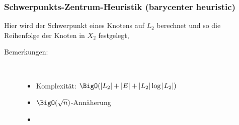 \topbreak
\vspace*{-2\baselineskip}
\subsubsection{Schwerpunkts-Zentrum-Heuristik (barycenter heuristic)}
Hier wird der Schwerpunkt eines Knotens auf $L_2$ berechnet und so die Reihenfolge der Knoten in $X_2$ festgelegt, 
\begin{description}
	\item[Bemerkungen:] \ \\ \vspace*{-\baselineskip}
		\begin{itemize}[itemsep=-1pt]
			\item Komplexität: $\BigO(|L_2|+|E|+|L_2|\log|L_2|)$
			\item $\BigO(\sqrt{n})$-Annäherung
			\item {}
		\end{itemize}
\end{description}

